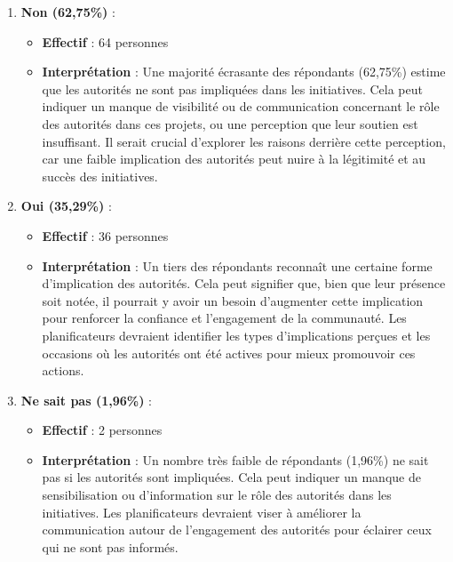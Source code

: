 \documentclass[
]{article}
\providecommand{\tightlist}{%
  \setlength{\itemsep}{0pt}\setlength{\parskip}{0pt}}
\begin{document}
\begin{enumerate}
\def\labelenumi{\arabic{enumi}.}
\tightlist
\item
  \textbf{Non (62,75\%)} :

  \begin{itemize}
  \tightlist
  \item
    \textbf{Effectif} : 64 personnes
  \item
    \textbf{Interprétation} : Une majorité écrasante des répondants
    (62,75\%) estime que les autorités ne sont pas impliquées dans les
    initiatives. Cela peut indiquer un manque de visibilité ou de
    communication concernant le rôle des autorités dans ces projets, ou
    une perception que leur soutien est insuffisant. Il serait crucial
    d'explorer les raisons derrière cette perception, car une faible
    implication des autorités peut nuire à la légitimité et au succès
    des initiatives.
  \end{itemize}
\item
  \textbf{Oui (35,29\%)} :

  \begin{itemize}
  \tightlist
  \item
    \textbf{Effectif} : 36 personnes
  \item
    \textbf{Interprétation} : Un tiers des répondants reconnaît une
    certaine forme d'implication des autorités. Cela peut signifier que,
    bien que leur présence soit notée, il pourrait y avoir un besoin
    d'augmenter cette implication pour renforcer la confiance et
    l'engagement de la communauté. Les planificateurs devraient
    identifier les types d'implications perçues et les occasions où les
    autorités ont été actives pour mieux promouvoir ces actions.
  \end{itemize}
\item
  \textbf{Ne sait pas (1,96\%)} :

  \begin{itemize}
  \tightlist
  \item
    \textbf{Effectif} : 2 personnes
  \item
    \textbf{Interprétation} : Un nombre très faible de répondants
    (1,96\%) ne sait pas si les autorités sont impliquées. Cela peut
    indiquer un manque de sensibilisation ou d'information sur le rôle
    des autorités dans les initiatives. Les planificateurs devraient
    viser à améliorer la communication autour de l'engagement des
    autorités pour éclairer ceux qui ne sont pas informés.
  \end{itemize}
\end{enumerate}
\end{document}
